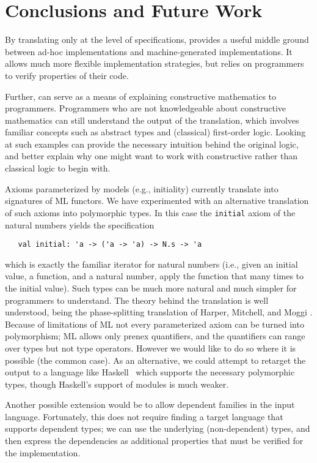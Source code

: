 \section{Conclusions and Future Work}
\label{sec:conclusion}

By translating only at the level of specifications, \RZ provides a
useful middle ground between ad-hoc implementations and
machine-generated implementations.  It allows much more flexible
implementation strategies, but relies on programmers to
verify properties of their code.

Further, \RZ can serve as a means of explaining constructive
mathematics to programmers.  Programmers who are not knowledgeable
about constructive mathematics can still understand the output of the
translation, which involves familiar concepts such as abstract types
and (classical) first-order logic.   Looking at such examples can
provide the necessary intuition behind the original logic, and better
explain why one might want to work with constructive rather than
classical logic to begin with.

Axioms parameterized by models (e.g., initiality) currently translate
into signatures of ML functors.  We have experimented with an
alternative translation of such axioms into polymorphic types.  In
this case the \Verb|initial| axiom of the natural numbers yields
the specification
\begin{Verbatim}
   val initial: 'a -> ('a -> 'a) -> N.s -> 'a
\end{Verbatim}
which is exactly the familiar iterator for natural numbers (i.e.,
given an initial value, a function, and a natural number, apply the
function that many times to the initial value).  Such types can be
much more natural and much simpler for programmers to understand.  The
theory behind the translation is well understood, being the
phase-splitting translation of Harper, Mitchell, and Moggi
\cite{harper+:popl90}.  Because of limitations of ML not every
parameterized axiom can be turned into polymorphism; ML allows only
prenex quantifiers, and the quantifiers can range over types but not
type operators.  However we would like to do so where it is possible
(the common case).  As an alternative, we could attempt to retarget
the output to a language like Haskell~\cite{haskell} which supports
the necessary polymorphic types, though Haskell's support of modules
is much weaker.

Another possible extension would be to allow dependent families in the
input language. Fortunately, this does not require finding a target
language that supports dependent types; we can use the underlying
(non-dependent) types, and then express the dependencies as additional
properties that must be verified for the implementation.


